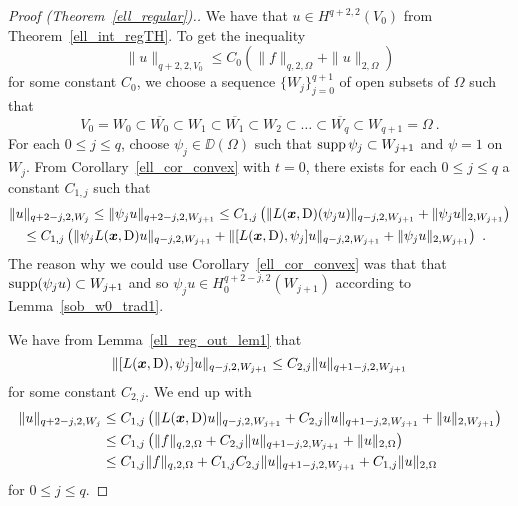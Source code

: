 \begin{proof}[Proof (Theorem~\ref{ell_regular}).]
We have that $\displaystyle u \in H^{q+2,2}(V_0)$ from
Theorem~\ref{ell_int_regTH}.  To get the inequality
\[
\|u\|_{q+2,2,V_0} \leq C_0 \left( \|f\|_{q,2,\Omega} + \|u\|_{2,\Omega} \right)
\]
for some constant $C_0$, we choose a sequence
$\displaystyle \{ W_j\}_{j=0}^{q+1}$ of open subsets of $\Omega$ such that
\[
V_0 = W_0 \subset \overline{W_0} \subset W_1 \subset \overline{W_1}
\subset W_2 \subset \ldots \subset \overline{W_q} \subset
W_{q+1} = \Omega \  .
\]
For each $0\leq j \leq q$, choose $\psi_j \in \DD(\Omega)$ such
that $\operatorname{supp} \psi_j \subset W_{j+1}$ and $\psi = 1$ on $W_j$.
From Corollary~\ref{ell_cor_convex} with $t=0$, there exists
for each $0\leq j \leq q$ a constant $C_{1,j}$ such that
\begin{align*}
&\| u \|_{q+2-j,2,W_j} \leq \| \psi_j u \|_{q+2-j,2,W_{j+1}}
\leq C_{1,j} \left( \|L({\bm{x}},\operatorname{D}) (\psi_j u)\|_{q-j,2,W_{j+1}} +
\|\psi_j u \|_{2,W_{j+1}} \right) \\
&\quad \leq C_{1,j} \left( \| \psi_j L({\bm{x}},\operatorname{D}) u\|_{q-j,2,W_{j+1}}
+ \| [L({\bm{x}},\operatorname{D}),\psi_j]  u \|_{q-j,2,W_{j+1}}
 + \|\psi_j u \|_{2,W_{j+1}} \right) \ .
\end{align*}
The reason why we could use Corollary~\ref{ell_cor_convex} was that
that $\operatorname{supp} (\psi_j u) \subset W_{j+1}$ and so 
$\displaystyle \psi_j u \in H^{q+2-j,2}_0(W_{j+1})$ according to
Lemma~\ref{sob_w0_trad1}.

We have from Lemma~\ref{ell_reg_out_lem1} that
\[
\| [ L({\bm{x}},\operatorname{D}) , \psi_j] u\|_{q-j,2,W_{j+1}}
\leq C_{2,j} \|u\|_{q+1-j,2,W_{j+1}}
\]
for some constant $C_{2,j}$.  We end up with
\begin{align}
\| u \|_{q+2-j,2,W_j} &\leq C_{1,j} \left( \| L({\bm{x}},\operatorname{D}) u\|_{q-j,2,W_{j+1}}
+ C_{2,j} \|u\|_{q+1-j,2,W_{j+1}} + \| u \|_{2,W_{j+1}} \right) \nonumber \\
&\leq C_{1,j} \left( \|f\|_{q,2,\Omega}
+ C_{2,j} \|u\|_{q+1-j,2,W_{j+1}} + \| u \|_{2,\Omega} \right) \nonumber \\
&\leq C_{1,j} \|f\|_{q,2,\Omega}
+ C_{1,j} C_{2,j} \|u\|_{q+1-j,2,W_{j+1}} + C_{1,j} \| u \|_{2,\Omega}
\label{ell_ind_RT1}
\end{align}
for $0\leq j \leq q$.


\end{proof}
